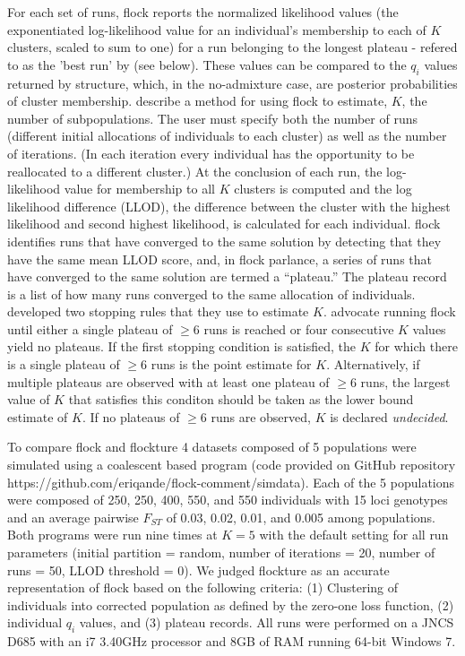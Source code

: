 For each set of runs, {\sc flock} reports the 
normalized likelihood values (the exponentiated log-likelihood value for an individual's 
membership to each of $K$ clusters, scaled to sum to one) for a run belonging to the 
longest plateau - refered to as the 'best run' by \citep{Duc&Tur2012} (see below).
These values can be compared to the $q_i$ values
returned by {\sc structure}, which, in the no-admixture case, are posterior 
probabilities of cluster membership. \citet{Duc&Tur2012} describe a method 
for using {\sc flock} to estimate, $K$, the number of
subpopulations. The user must specify both the number of runs 
(different initial allocations of individuals 
to each cluster) as well as the number of iterations. (In each iteration every individual 
has the opportunity to be reallocated 
to a different cluster.) At the conclusion of each run, the log-likelihood value for 
membership to all $K$ clusters is computed
and the log likelihood difference (LLOD), the difference between the 
cluster with the highest likelihood 
and second highest likelihood, is calculated for each individual. {\sc flock} 
identifies runs that have converged to the same solution by detecting 
that they have the same mean LLOD score, and, in 
{\sc flock} parlance, a series of runs that have converged to the same 
solution are termed a ``plateau.'' The plateau record is a list of 
how many runs converged to the same allocation
of individuals. \citet{Duc&Tur2012} developed two stopping 
rules that they use to estimate $K$. \citet{Duc&Tur2012} advocate 
running  {\sc flock} until either a single plateau of
$\geq 6$ runs is reached or four consecutive $K$ values yield no 
plateaus. If the first stopping condition is satisfied, the $K$ for which 
there is a single plateau of $\geq 6$ runs is the point estimate for $K$. 
Alternatively, if multiple plateaus are observed with at least one plateau 
of $\geq 6$ runs, the largest value of $K$ that satisfies 
this conditon should be taken as the lower bound estimate of $K$. 
If no plateaus of $\geq 6$ runs are observed, $K$
is declared {\em undecided}.

To compare {\sc flock} and {\sc flockture} 4 datasets composed of 5 populations
were simulated using a coalescent based program (code provided on GitHub repository 
https://github.com/eriqande/flock-comment/simdata). Each of the 5 populations
were composed of 250, 250, 400, 550, and 550 individuals with 15 loci genotypes
and an average pairwise $F_{ST}$ of 0.03, 0.02, 0.01, and 0.005 among
populations. Both programs were run nine times at $K=5$ with the default setting for all 
run parameters (initial partition = random, number of iterations = 20, number of runs = 50, 
LLOD threshold = 0). We judged {\sc flockture} as an accurate 
representation of {\sc flock} based on the
following criteria: (1) Clustering of individuals into corrected population as
 defined by the zero-one loss function, (2) individual $q_i$ values, and (3) plateau records. 
All runs were performed on a JNCS D685 with an i7 3.40GHz processor and 8GB of 
RAM running 64-bit Windows 7. 

